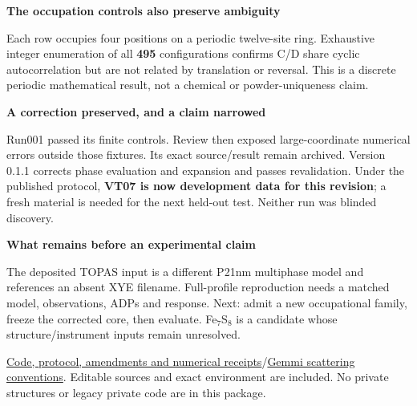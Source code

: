 \documentclass[10pt,a4paper]{article}
\newcommand{\labeltext}[1]{{\sffamily\bfseries\color{teal}#1}}
\begin{document}
\labeltext{The occupation controls also preserve ambiguity}\par
\begin{center}
\end{center}
{\small Each row occupies four positions on a periodic twelve-site ring. Exhaustive integer enumeration of all \textbf{495} configurations confirms C/D share cyclic autocorrelation but are not related by translation or reversal. This is a discrete periodic mathematical result, not a chemical or powder-uniqueness claim.}

\labeltext{A correction preserved, and a claim narrowed}\par
Run001 passed its finite controls. Review then exposed large-coordinate numerical errors outside those fixtures. Its exact source/result remain archived. Version 0.1.1 corrects phase evaluation and expansion and passes revalidation. Under the published protocol, \textbf{VT07 is now development data for this revision}; a fresh material is needed for the next held-out test. Neither run was blinded discovery.

\labeltext{What remains before an experimental claim}\par
The deposited TOPAS input is a different P21nm multiphase model and references an absent XYE filename. Full-profile reproduction needs a matched model, observations, ADPs and response. Next: admit a new occupational family, freeze the corrected core, then evaluate. Fe$_7$S$_8$ is a candidate whose structure/instrument inputs remain unresolved.

{\footnotesize\color{muted}\href{https://github.com/xchemtina/chimialabs-osi-2026/tree/generalization-20261025/benchmark}{Code, protocol, amendments and numerical receipts}\quad /\quad \href{https://gemmi.readthedocs.io/en/stable/scattering.html}{Gemmi scattering conventions}. Editable sources and exact environment are included. No private structures or legacy private code are in this package.}
\end{document}
